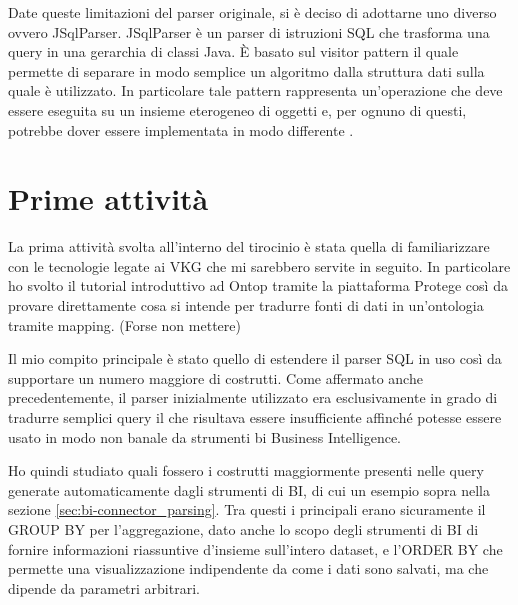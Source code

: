 Date queste limitazioni del parser originale, si è deciso di adottarne uno diverso ovvero JSqlParser. JSqlParser è un parser di istruzioni SQL
che trasforma una query in una gerarchia di classi Java. \`E basato sul visitor pattern il quale permette di separare in modo semplice un algoritmo dalla struttura dati sulla quale è utilizzato. 
In particolare tale pattern rappresenta un'operazione che deve essere eseguita su un insieme eterogeneo di oggetti e, per ognuno di questi, potrebbe dover essere implementata in modo differente \cite{JSqlParser}.

\section{Prime attività}
\label{sec:prerequisits}
La prima attività svolta all'interno del tirocinio è stata quella di familiarizzare con le tecnologie legate ai VKG che mi sarebbero servite in seguito. In particolare ho svolto
il tutorial introduttivo ad Ontop tramite la piattaforma Protege così da provare direttamente cosa si intende per tradurre fonti di dati in un'ontologia tramite mapping. (Forse non mettere)

Il mio compito principale è stato quello di estendere il parser SQL in uso così da supportare un numero maggiore di costrutti. Come affermato anche precedentemente, il parser inizialmente utilizzato era 
esclusivamente in grado di tradurre semplici query il che risultava essere insufficiente affinché potesse essere usato in modo non banale da strumenti bi Business Intelligence.

Ho quindi studiato quali fossero i costrutti maggiormente presenti nelle query generate automaticamente dagli strumenti di BI, di cui un esempio sopra nella sezione \ref{sec:bi-connector_parsing}. Tra questi 
i principali erano sicuramente il GROUP BY per l'aggregazione, dato anche lo scopo degli strumenti di BI di fornire informazioni riassuntive d'insieme sull'intero dataset, e l'ORDER BY che 
permette una visualizzazione indipendente da come i dati sono salvati, ma che dipende da parametri arbitrari.


